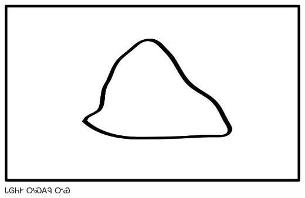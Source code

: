 \documentclass[avery5371]{flashcards}%
\begin{document}
\begin{flashcard}{
\includegraphics[width=0.95\columnwidth,height=.51\columnwidth,keepaspectratio]{../artwork/objects-neutral/nvya}
}\Huge ᏓᎶᏂᎨ ᎤᏍᎪᎸ ᏅᏯ
\end{flashcard}
\end{document}
